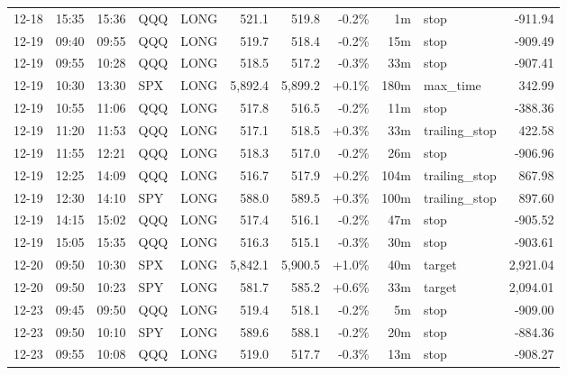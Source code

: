 \documentclass[11pt,a4paper,twoside]{article}
\begin{document}
\begin{center}
\begin{longtable}{>{\color{txtmain}}l l l l l r r r r >{\color{txtmain}}l r}
12-18 & 15:35 & 15:36 & QQQ & LONG & 521.1 & 519.8 & \textcolor{lossred}{-0.2\%} & 1m & stop & \textcolor{lossred}{-911.94} \\
12-19 & 09:40 & 09:55 & QQQ & LONG & 519.7 & 518.4 & \textcolor{lossred}{-0.2\%} & 15m & stop & \textcolor{lossred}{-909.49} \\
12-19 & 09:55 & 10:28 & QQQ & LONG & 518.5 & 517.2 & \textcolor{lossred}{-0.3\%} & 33m & stop & \textcolor{lossred}{-907.41} \\
12-19 & 10:30 & 13:30 & SPX & LONG & 5,892.4 & 5,899.2 & \textcolor{wingreen}{+0.1\%} & 180m & max\_time & \textcolor{wingreen}{342.99} \\
12-19 & 10:55 & 11:06 & QQQ & LONG & 517.8 & 516.5 & \textcolor{lossred}{-0.2\%} & 11m & stop & \textcolor{lossred}{-388.36} \\
12-19 & 11:20 & 11:53 & QQQ & LONG & 517.1 & 518.5 & \textcolor{wingreen}{+0.3\%} & 33m & trailing\_stop & \textcolor{wingreen}{422.58} \\
12-19 & 11:55 & 12:21 & QQQ & LONG & 518.3 & 517.0 & \textcolor{lossred}{-0.2\%} & 26m & stop & \textcolor{lossred}{-906.96} \\
12-19 & 12:25 & 14:09 & QQQ & LONG & 516.7 & 517.9 & \textcolor{wingreen}{+0.2\%} & 104m & trailing\_stop & \textcolor{wingreen}{867.98} \\
12-19 & 12:30 & 14:10 & SPY & LONG & 588.0 & 589.5 & \textcolor{wingreen}{+0.3\%} & 100m & trailing\_stop & \textcolor{wingreen}{897.60} \\
12-19 & 14:15 & 15:02 & QQQ & LONG & 517.4 & 516.1 & \textcolor{lossred}{-0.2\%} & 47m & stop & \textcolor{lossred}{-905.52} \\
12-19 & 15:05 & 15:35 & QQQ & LONG & 516.3 & 515.1 & \textcolor{lossred}{-0.3\%} & 30m & stop & \textcolor{lossred}{-903.61} \\
12-20 & 09:50 & 10:30 & SPX & LONG & 5,842.1 & 5,900.5 & \textcolor{wingreen}{+1.0\%} & 40m & target & \textcolor{wingreen}{2,921.04} \\
12-20 & 09:50 & 10:23 & SPY & LONG & 581.7 & 585.2 & \textcolor{wingreen}{+0.6\%} & 33m & target & \textcolor{wingreen}{2,094.01} \\
12-23 & 09:45 & 09:50 & QQQ & LONG & 519.4 & 518.1 & \textcolor{lossred}{-0.2\%} & 5m & stop & \textcolor{lossred}{-909.00} \\
12-23 & 09:50 & 10:10 & SPY & LONG & 589.6 & 588.1 & \textcolor{lossred}{-0.2\%} & 20m & stop & \textcolor{lossred}{-884.36} \\
12-23 & 09:55 & 10:08 & QQQ & LONG & 519.0 & 517.7 & \textcolor{lossred}{-0.3\%} & 13m & stop & \textcolor{lossred}{-908.27} \\

\end{longtable}
\end{center}
\end{document}
